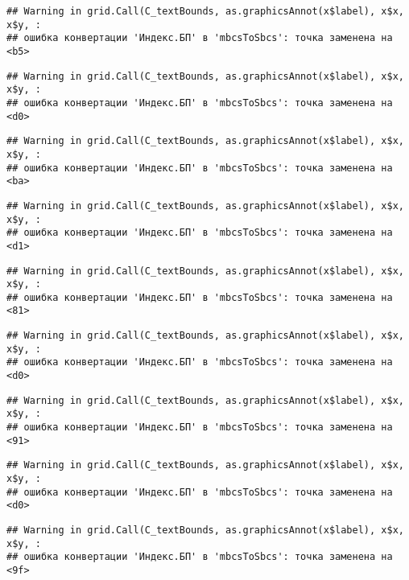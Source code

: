 \documentclass[
]{article}
\begin{document}
\begin{verbatim}
## Warning in grid.Call(C_textBounds, as.graphicsAnnot(x$label), x$x, x$y, :
## ошибка конвертации 'Индекс.БП' в 'mbcsToSbcs': точка заменена на <b5>
\end{verbatim}

\begin{verbatim}
## Warning in grid.Call(C_textBounds, as.graphicsAnnot(x$label), x$x, x$y, :
## ошибка конвертации 'Индекс.БП' в 'mbcsToSbcs': точка заменена на <d0>
\end{verbatim}

\begin{verbatim}
## Warning in grid.Call(C_textBounds, as.graphicsAnnot(x$label), x$x, x$y, :
## ошибка конвертации 'Индекс.БП' в 'mbcsToSbcs': точка заменена на <ba>
\end{verbatim}

\begin{verbatim}
## Warning in grid.Call(C_textBounds, as.graphicsAnnot(x$label), x$x, x$y, :
## ошибка конвертации 'Индекс.БП' в 'mbcsToSbcs': точка заменена на <d1>
\end{verbatim}

\begin{verbatim}
## Warning in grid.Call(C_textBounds, as.graphicsAnnot(x$label), x$x, x$y, :
## ошибка конвертации 'Индекс.БП' в 'mbcsToSbcs': точка заменена на <81>
\end{verbatim}

\begin{verbatim}
## Warning in grid.Call(C_textBounds, as.graphicsAnnot(x$label), x$x, x$y, :
## ошибка конвертации 'Индекс.БП' в 'mbcsToSbcs': точка заменена на <d0>
\end{verbatim}

\begin{verbatim}
## Warning in grid.Call(C_textBounds, as.graphicsAnnot(x$label), x$x, x$y, :
## ошибка конвертации 'Индекс.БП' в 'mbcsToSbcs': точка заменена на <91>
\end{verbatim}

\begin{verbatim}
## Warning in grid.Call(C_textBounds, as.graphicsAnnot(x$label), x$x, x$y, :
## ошибка конвертации 'Индекс.БП' в 'mbcsToSbcs': точка заменена на <d0>
\end{verbatim}

\begin{verbatim}
## Warning in grid.Call(C_textBounds, as.graphicsAnnot(x$label), x$x, x$y, :
## ошибка конвертации 'Индекс.БП' в 'mbcsToSbcs': точка заменена на <9f>
\end{verbatim}
\end{document}
